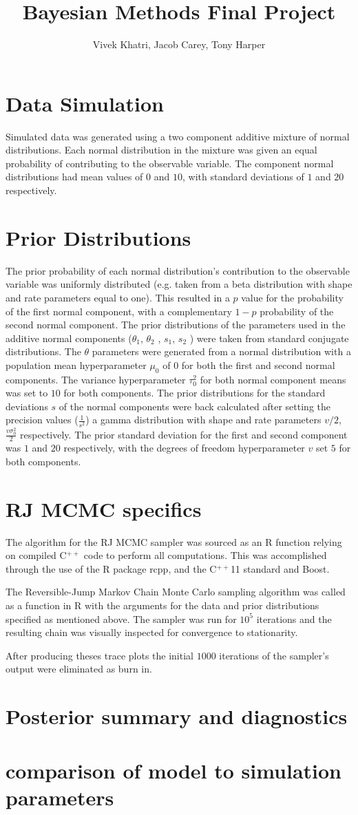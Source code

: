 \documentclass[12pt]{article}
\title{Bayesian Methods Final Project}
\author{Vivek Khatri, Jacob Carey, Tony Harper}
\date{}
\begin{document}
\section*{Data Simulation}
Simulated data was generated using a two component additive mixture of normal distributions.  Each normal distribution in the mixture was given an equal probability of contributing to the observable variable. The component normal distributions had mean values of $0$ and $10$, with standard deviations of $1$ and $20$ respectively.

\section*{Prior Distributions}
The prior probability of each normal distribution’s contribution to the observable variable was uniformly distributed (e.g. taken from a beta distribution with shape and rate parameters equal to one). This resulted in a $p$ value for the probability of the first normal component, with a complementary $1-p$ probability of the second normal component.
The prior distributions of the parameters used in the additive normal components ($\theta_1$, $\theta_2$ , $s_1$, $s_2$ ) were taken from standard conjugate distributions. The $\theta$ parameters were generated from a normal distribution with a population mean hyperparameter $\mu_0$ of $0$ for both the first and second normal components. The variance hyperparameter $\tau_0^2$ for both normal component means was set to $10$ for both components.
	The prior distributions for the standard deviations $s$ of the normal components were back calculated after setting the precision values ($\frac{1}{s^2}$)  a gamma distribution with shape and rate parameters $v/2$, $\frac{v\sigma_0^2}{2}$ respectively. The prior standard deviation for the first and second component  was $1$ and $20$ respectively, with the degrees of freedom hyperparameter $v$ set $5$ for both components. 

\section*{RJ MCMC specifics}
The algorithm for the RJ MCMC sampler was sourced as an R function relying on compiled C$^{++}$ code  to perform all computations. This was accomplished through the use of the R package rcpp, and the C$^{++}$11 standard and Boost. 

The Reversible-Jump Markov Chain Monte Carlo sampling algorithm was called as a function in R with the arguments for the data and prior distributions specified as mentioned above. The sampler was run for $10^5$ iterations and the resulting chain was visually inspected for convergence to stationarity.


After producing theses trace plots the initial $1000$ iterations of the sampler's output were eliminated as burn in.

\section*{Posterior summary and diagnostics}

\section*{comparison of model to simulation parameters}
\end{document}

